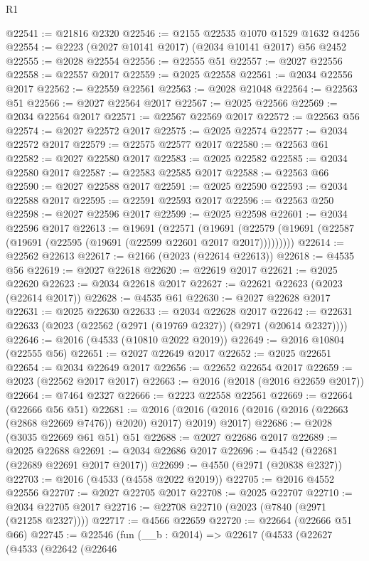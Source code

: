 \begin{lexlean}{R1}
\begin{coremodule}
@22541 := @21816 @2320
@22546 := @2155 @22535 @1070 @1529 @1632 @4256
@22554 := @2223 (@2027 @10141 @2017) (@2034 @10141 @2017) @56 @2452
@22555 := @2028 @22554
@22556 := @22555 @51
@22557 := @2027 @22556
@22558 := @22557 @2017
@22559 := @2025 @22558
@22561 := @2034 @22556 @2017
@22562 := @22559 @22561
@22563 := @2028 @21048
@22564 := @22563 @51
@22566 := @2027 @22564 @2017
@22567 := @2025 @22566
@22569 := @2034 @22564 @2017
@22571 := @22567 @22569 @2017
@22572 := @22563 @56
@22574 := @2027 @22572 @2017
@22575 := @2025 @22574
@22577 := @2034 @22572 @2017
@22579 := @22575 @22577 @2017
@22580 := @22563 @61
@22582 := @2027 @22580 @2017
@22583 := @2025 @22582
@22585 := @2034 @22580 @2017
@22587 := @22583 @22585 @2017
@22588 := @22563 @66
@22590 := @2027 @22588 @2017
@22591 := @2025 @22590
@22593 := @2034 @22588 @2017
@22595 := @22591 @22593 @2017
@22596 := @22563 @250
@22598 := @2027 @22596 @2017
@22599 := @2025 @22598
@22601 := @2034 @22596 @2017
@22613 := @19691
    (@22571
      (@19691 (@22579 (@19691 (@22587 (@19691 (@22595 (@19691 (@22599 @22601 @2017 @2017)))))))))
@22614 := @22562 @22613
@22617 := @2166 (@2023 (@22614 @22613))
@22618 := @4535 @56
@22619 := @2027 @22618
@22620 := @22619 @2017
@22621 := @2025 @22620
@22623 := @2034 @22618 @2017
@22627 := @22621 @22623 (@2023 (@22614 @2017))
@22628 := @4535 @61
@22630 := @2027 @22628 @2017
@22631 := @2025 @22630
@22633 := @2034 @22628 @2017
@22642 := @22631 @22633 (@2023 (@22562 (@2971 (@19769 @2327)) (@2971 (@20614 @2327))))
@22646 := @2016 (@4533 (@10810 @2022 @2019))
@22649 := @2016 @10804 (@22555 @56)
@22651 := @2027 @22649 @2017
@22652 := @2025 @22651
@22654 := @2034 @22649 @2017
@22656 := @22652 @22654 @2017
@22659 := @2023 (@22562 @2017 @2017)
@22663 := @2016 (@2018 (@2016 @22659 @2017))
@22664 := @7464 @2327
@22666 := @2223 @22558 @22561
@22669 := @22664 (@22666 @56 @51)
@22681 := @2016
    (@2016 (@2016 (@2016 (@2016 (@22663 (@2868 @22669 @7476)) @2020) @2017) @2019) @2017)
@22686 := @2028 (@3035 @22669 @61 @51) @51
@22688 := @2027 @22686 @2017
@22689 := @2025 @22688
@22691 := @2034 @22686 @2017
@22696 := @4542 (@22681 (@22689 @22691 @2017 @2017))
@22699 := @4550 (@2971 (@20838 @2327))
@22703 := @2016 (@4533 (@4558 @2022 @2019))
@22705 := @2016 @4552 @22556
@22707 := @2027 @22705 @2017
@22708 := @2025 @22707
@22710 := @2034 @22705 @2017
@22716 := @22708 @22710 (@2023 (@7840 (@2971 (@21258 @2327))))
@22717 := @4566 @22659
@22720 := @22664 (@22666 @51 @66)
@22745 := @22546
    (fun (__b : @2014) =>
    @22617
      (@4533
        (@22627
          (@4533
            (@22642
              (@22646

\end{coremodule}
\end{lexlean}
